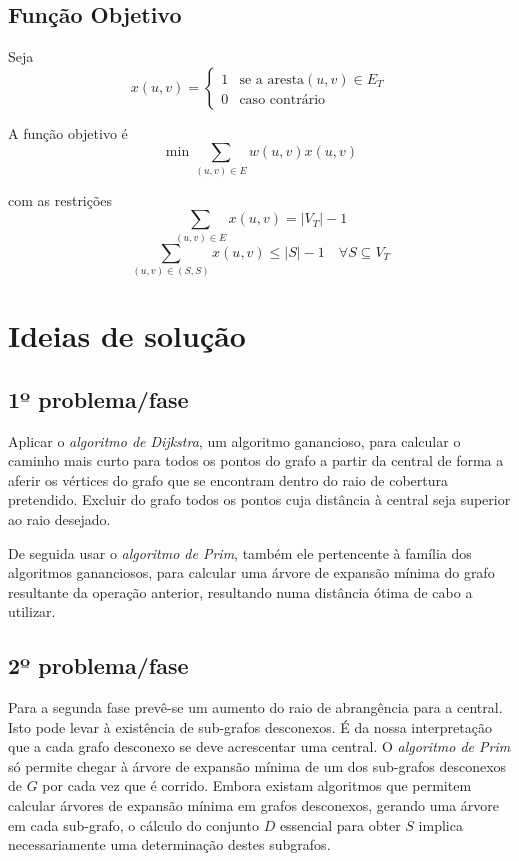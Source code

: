 \documentclass[a4paper,12pt,titlepage]{article}
\begin{document}
\subsection*{Função Objetivo}
Seja $$x(u,v) = \begin{cases}
1 & \text{se a aresta} (u,v) \in E_T\\
0 & \text{caso contrário} 
\end{cases}$$

A função objetivo é\cite{ieor_mst}
$$\min \sum_{(u,v)\in E} w(u,v)x(u,v)$$

com as restrições 
$$\sum_{(u,v)\in E} x(u,v) = |V_T| - 1$$
$$\sum_{(u,v)\in (S,S)} x(u,v) \leq |S| - 1 \quad \forall S \subseteq V_T$$

\section{Ideias de solução}
\subsection{1º problema/fase}
Aplicar o \emph{algoritmo de Dijkstra}, um algoritmo ganancioso, para calcular o caminho mais curto para todos os pontos do grafo a partir da central de forma a aferir os vértices do grafo que se encontram dentro do raio de cobertura pretendido. Excluir do grafo todos os pontos cuja distância à central seja superior ao raio desejado.

De seguida usar o \emph{algoritmo de Prim}, também ele pertencente à família dos algoritmos gananciosos, para calcular uma árvore de expansão mínima do grafo resultante da operação anterior, resultando numa distância ótima de cabo a utilizar.

\subsection{2º problema/fase}
Para a segunda fase prevê-se um aumento do raio de abrangência para a central. Isto pode levar à existência de sub-grafos desconexos. É da nossa interpretação que a cada grafo desconexo se deve acrescentar uma central. O \emph{algoritmo de Prim} só permite chegar à árvore de expansão mínima de um dos sub-grafos desconexos de $G$ por cada vez que é corrido. Embora existam algoritmos que permitem calcular árvores de expansão mínima em grafos desconexos, gerando uma árvore em cada sub-grafo, o cálculo do conjunto $D$ essencial para obter $S$ implica necessariamente uma determinação destes subgrafos.
\end{document}
